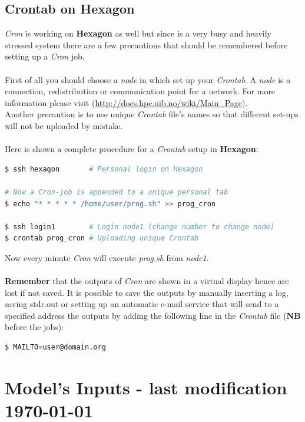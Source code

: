 \documentclass[12pt,a4paper]{report}
\begin{document}
\section{Crontab on Hexagon}
\textit{Cron} is working on \textbf{Hexagon} as well but since is a very busy and heavily stressed system there are a few precautions that should be remembered before setting up a \textit{Cron} job. \\ \\
First of all you should choose a \textit{node} in which set up your \textit{Crontab}. A \textit{node} is a connection, redistribution or communication point for a network. For more information please visit (\url{http://docs.hpc.uib.no/wiki/Main_Page}). \\
Another precaution is to use unique \textit{Crontab} file's names so that different set-ups will not be uploaded by mistake. \\ \\
Here is shown a complete procedure for a \textit{Crontab} setup in \textbf{Hexagon}: \\
\begin{lstlisting}[language=bash]
$ ssh hexagon		# Personal login on Hexagon

# Now a Cron-job is appended to a unique personal tab 
$ echo "* * * * * /home/user/prog.sh" >> prog_cron

$ ssh login1		# Login node1 (change number to change node)
$ crontab prog_cron	# Uploading unique Crontab
\end{lstlisting}
Now every minute \textit{Cron} will execute \textit{prog.sh} from \textit{node1}. \\ \\
\textbf{Remember} that the outputs of \textit{Cron} are shown in a virtual display hence are lost if not saved. It is possible to save the outputs by manually inserting a log, saving stdr.out or setting up an automatic e-mail service that will send to a specified address the outputs by adding the following line in the \textit{Crontab} file (\textbf{NB} before the jobs):
\begin{lstlisting}[language=bash]
$ MAILTO=user@domain.org
\end{lstlisting}



\chapter{Model's Inputs - last modification \today}
\end{document}
